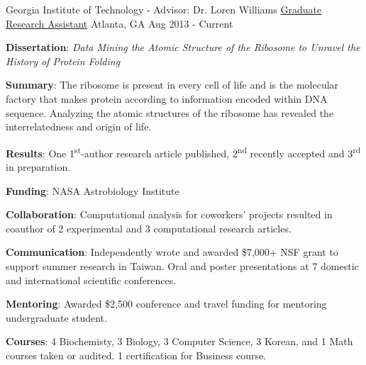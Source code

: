 

\begin{cventries}

  \cventry
    {Georgia Institute of Technology - Advisor: Dr. Loren Williams} %
    {\href{https://scholar.google.com/citations?hl=en&user=KIFFrX4AAAAJ&view_op=list_works&gmla=AJsN-F6ZS9ZeLqMG4o6JCZS87HLjoP76wA4kFValw4xx0A6ZWJJoxCWe2xu6VZvt_LgEw9YpCglVTlKY_5PfKpxiyghYFxLPNm5zrUwdBE5Fn-Sr098nt7NJGM2cH5l47IrTsSra8Vob}{Graduate Research Assistant}} %
    {Atlanta, GA} %
    {Aug 2013 - Current} %
    {{\textbf{Dissertation}: \textit{Data Mining the Atomic Structure of the Ribosome to Unravel the History of Protein Folding}}
      \begin{cvitems} %
      \vspace{4.0mm}
        \item \textbf{Summary}: The ribosome is present in every cell of life and is the molecular factory that makes protein according to information encoded within DNA sequence. Analyzing the atomic structures of the ribosome has revealed the interrelatedness and origin of life.
        \item \textbf{Results}: One 1\textsuperscript{st}-author research article published, 2\textsuperscript{nd} recently accepted and 3\textsuperscript{rd} in preparation.
        \item \textbf{Funding}: NASA Astrobiology Institute
        \item \textbf{Collaboration}: Computational analysis for coworkers' projects resulted in coauthor of 2 experimental and 3 computational research articles.
        \item \textbf{Communication}: Independently wrote and awarded \$7,000+ NSF grant to support summer research in Taiwan. Oral and poster presentations at 7 domestic and international scientific conferences.
        \item \textbf{Mentoring}: Awarded \$2,500 conference and travel funding for mentoring undergraduate student.
        \item \textbf{Courses}: 4 Biochemisty, 3 Biology, 3 Computer Science, 3 Korean, and 1 Math courses taken or audited. 1 certification for Business course. 
      \end{cvitems}
    }


\end{cventries}
